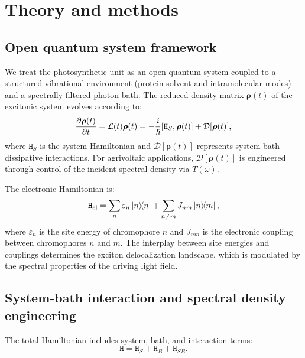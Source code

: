 
\section{Theory and methods}\label{sec:Theory}

\subsection{Open quantum system framework}

We treat the photosynthetic unit as an open quantum system coupled to a structured vibrational environment (protein-solvent and intramolecular modes) and a spectrally filtered photon bath. The reduced density matrix $\bm{\rho}(t)$ of the excitonic system evolves according to:
\begin{equation}\label{eq:master_eq}
\pdv{\bm{\rho}(t)}{t} = \mathcal{L}(t)\bm{\rho}(t) = -\frac{i}{\hbar}[\mathtt{H}_S, \bm{\rho}(t)] + \mathcal{D}[\bm{\rho}(t)],
\end{equation}
where $\mathtt{H}_S$ is the system Hamiltonian and $\mathcal{D}[\bm{\rho}(t)]$ represents system-bath dissipative interactions. For agrivoltaic applications, $\mathcal{D}[\bm{\rho}(t)]$ is engineered through control of the incident spectral density via $T(\omega)$.

The electronic Hamiltonian is:
\begin{equation}\label{eq:excitonic_hamiltonian}
\mathtt{H}_{\rm el} = \sum_n \varepsilon_n \dyad{n} + \sum_{n \neq m} J_{nm} \dyad{n}{m},
\end{equation}
where $\varepsilon_n$ is the site energy of chromophore $n$ and $J_{nm}$ is the electronic coupling between chromophores $n$ and $m$. The interplay between site energies and couplings determines the exciton delocalization landscape, which is modulated by the spectral properties of the driving light field.

\subsection{System-bath interaction and spectral density engineering}

The total Hamiltonian includes system, bath, and interaction terms:
\begin{equation}\label{eq:system_bath_hamiltonian}
\mathtt{H} = \mathtt{H}_S + \mathtt{H}_B + \mathtt{H}_{SB}.
\end{equation}

